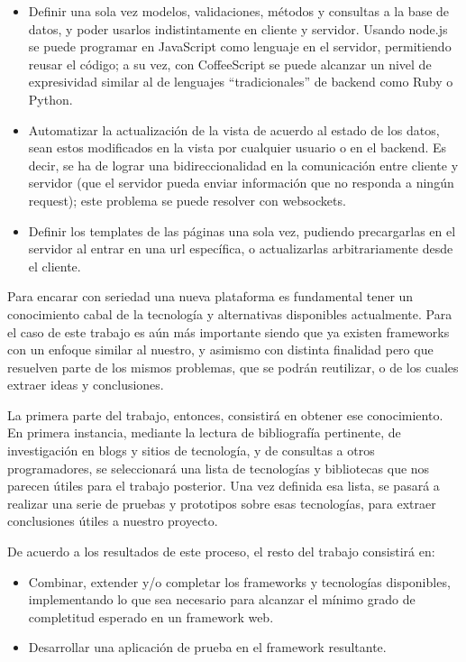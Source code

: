 \documentclass[doc,helv,longtable]{article}
\begin{document}
\begin{itemize}
\item  Definir una sola vez modelos, validaciones, métodos y consultas a la base de datos, y poder usarlos indistintamente en cliente y servidor. Usando node.js\cite{node} se puede programar en JavaScript como lenguaje en el servidor, permitiendo reusar el código; a su vez, con CoffeeScript\cite{coffee} se puede alcanzar un nivel de expresividad similar al de lenguajes “tradicionales” de backend como Ruby o Python.
\item  Automatizar la actualización de la vista de acuerdo al estado de los datos, sean estos modificados en la vista por cualquier usuario o en el backend. Es decir, se ha de lograr una bidireccionalidad en la comunicación entre cliente y servidor (que el servidor pueda enviar información que no responda a ningún request); este problema se puede resolver con websockets\cite{websockets}.
\item  Definir los templates de las páginas una sola vez, pudiendo precargarlas en el servidor al entrar en una url específica, o actualizarlas arbitrariamente desde el cliente.

\end{itemize}


Para encarar con seriedad una nueva plataforma es fundamental tener un conocimiento cabal de la tecnología y alternativas disponibles actualmente. Para el caso de este trabajo es aún más importante siendo que ya existen frameworks con un enfoque similar al nuestro, y asimismo con distinta finalidad pero que resuelven parte de los mismos problemas, que se podrán reutilizar, o de los cuales extraer ideas y conclusiones. 

La primera parte del trabajo, entonces, consistirá en obtener ese conocimiento. En primera instancia, mediante la lectura de bibliografía pertinente, de investigación en blogs y sitios de tecnología, y de consultas a otros programadores, se seleccionará una lista de tecnologías y bibliotecas que nos parecen útiles para el trabajo posterior. Una vez definida esa lista, se pasará a realizar una serie de pruebas y prototipos sobre esas tecnologías, para extraer conclusiones útiles a nuestro proyecto.

De acuerdo a los resultados de este proceso, el resto del trabajo consistirá en:
\begin{itemize}
\item  Combinar, extender y/o completar los frameworks y tecnologías disponibles, implementando lo que sea necesario para alcanzar el mínimo grado de completitud esperado en un framework web.  
\item  Desarrollar una aplicación de prueba en el framework resultante.

\end{itemize}
\end{document}
